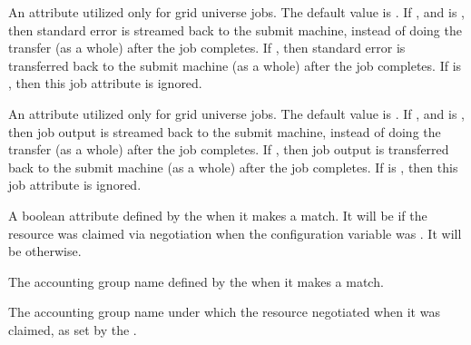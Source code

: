 \begin{description}
\item[\AdAttr{StreamErr}:]   
An attribute utilized only for grid universe jobs.
The default value is .
If , and  is , then 
standard error is streamed back to the submit machine, instead
of doing the transfer (as a whole) after the job completes.
If , then
standard error is transferred back to the submit machine
(as a whole) after the job completes.
If  is , then this job attribute is ignored.

\item[\AdAttr{StreamOut}:]   
An attribute utilized only for grid universe jobs.
The default value is .
If , and  is , then 
job output is streamed back to the submit machine, instead
of doing the transfer (as a whole) after the job completes.
If , then
job output is transferred back to the submit machine
(as a whole) after the job completes.
If  is , then this job attribute is ignored.

\item[\AdAttr{SubmitterAutoregroup}:]  A boolean attribute defined
by the  when it makes a match. 
It will be  if the resource was claimed via negotiation
when the configuration variable  was .
It will be  otherwise.

\item[\AdAttr{SubmitterGroup}:]  The accounting group name defined
by the  when it makes a match. 

\item[\AdAttr{SubmitterNegotiatingGroup}:]  The accounting group name under
which the resource negotiated when it was claimed, 
as set by the . 
 

\end{description}
